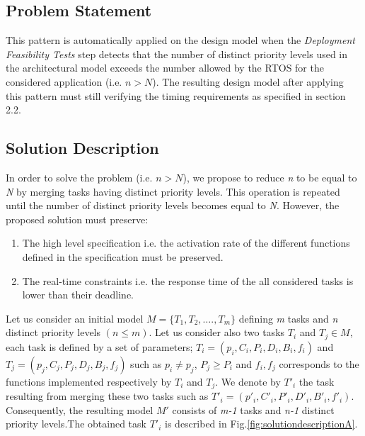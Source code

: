 \documentclass[runningheads,a4paper]{llncs}
\begin{document}
\subsection{Problem Statement}
This pattern is automatically applied on the design model when the \emph{Deployment Feasibility Tests }step detects that the number of distinct priority levels used in the architectural model exceeds the number allowed by the RTOS for the considered application (i.e. $n > N$). The resulting design model after applying this pattern must still verifying the timing requirements as specified in section 2.2.  
\subsection{Solution Description}
In order to solve the problem (i.e. $n > N$), we propose to reduce \textit{n} to be equal to \textit{N} by merging tasks having distinct priority levels. This operation is repeated until the number of distinct priority levels becomes equal to \textit{N}. However, the proposed solution must preserve:
\begin{enumerate}
\item The high level specification i.e. the activation rate of the different functions defined in the specification must be preserved. 
\item The real-time constraints i.e. the response time of the all considered tasks is lower than their deadline. 
\end{enumerate} 
Let us consider an initial model $M =\{T_1,T_2,….,T_m\}$ defining \emph{m} tasks and \emph{n} distinct priority levels $(n \leq m)$. Let us consider also two tasks $T_i$ and $T_j \in M$, each task is defined by a set of parameters; $T_i=(p_i,C_i,P_i,D_i,B_i,f_i)$ and $T_j=(p_j,C_j,P_j,D_j,B_j,f_j)$ such as  $p_i \ne p_j$, $P_j \geq P_i$ and $f_i,f_j$ corresponds to the functions implemented respectively by $T_i$ and $T_j$. We denote by $T'_i$ the  task resulting from merging these two tasks such as $T'_i =(p'_i,C'_i,P'_i,D'_i,B'_i,f'_i)$. Consequently, the resulting model $M'$ consists of \emph{m-1} tasks and \emph{n-1 }distinct priority levels.The obtained task $ T'_i$ is described in Fig.\ref{fig:solutiondescriptionA}.
\end{document}
